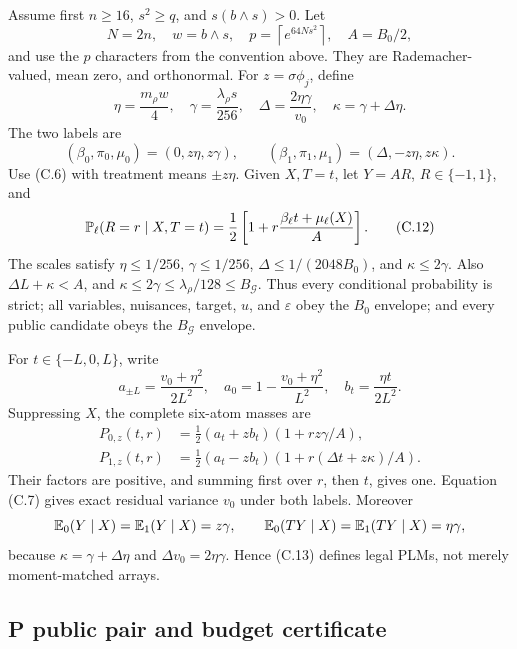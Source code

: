 Assume first \(n\ge16\), \(s^2\ge q\), and \(s(b\wedge s)>0\).  Let
\[
 N=2n,\quad w=b\wedge s,\quad
 p=\left\lceil e^{64Ns^2}\right\rceil,\quad
 A=B_0/2,
\]
and use the \(p\) characters from the convention above.  They are
Rademacher-valued, mean zero, and orthonormal.  For \(z=\sigma\phi_j\), define
\[
 \eta=\frac{m_\rho w}{4},\quad
 \gamma=\frac{\lambda_\rho s}{256},\quad
 \Delta=\frac{2\eta\gamma}{v_0},\quad
 \kappa=\gamma+\Delta\eta.
 \tag{C.10}
\]
The two labels are
\[
 (\beta_0,\pi_0,\mu_0)=(0,z\eta,z\gamma),\qquad
 (\beta_1,\pi_1,\mu_1)=(\Delta,-z\eta,z\kappa).
 \tag{C.11}
\]
Use (C.6) with treatment means \(\pm z\eta\).  Given \(X,T=t\), let
\(Y=AR\), \(R\in\{-1,1\}\), and
\[
 \mathbb P_\ell(R=r\mid X,T=t)
 =\frac12\left[1+r\frac{\beta_\ell t+\mu_\ell(X)}A\right].
 \tag{C.12}
\]
The scales satisfy \(\eta\le1/256\), \(\gamma\le1/256\),
\(\Delta\le1/(2048B_0)\), and \(\kappa\le2\gamma\).
Also \(\Delta L+\kappa<A\), and
\(\kappa\le2\gamma\le\lambda_\rho/128\le B_{\mathcal G}\).
Thus every conditional probability is strict; all variables, nuisances,
target, \(u\), and \(\varepsilon\) obey the \(B_0\) envelope; and every
public candidate obeys the \(B_{\mathcal G}\) envelope.

For \(t\in\{-L,0,L\}\), write
\[
 a_{\pm L}=\frac{v_0+\eta^2}{2L^2},\quad
 a_0=1-\frac{v_0+\eta^2}{L^2},\quad
 b_t=\frac{\eta t}{2L^2}.
\]
Suppressing \(X\), the complete six-atom masses are
\begin{align}
 P_{0,z}(t,r)&=\tfrac12(a_t+zb_t)(1+rz\gamma/A),\nonumber\\
 P_{1,z}(t,r)&=\tfrac12(a_t-zb_t)(1+r(\Delta t+z\kappa)/A).
 \tag{C.13}
\end{align}
Their factors are positive, and summing first over \(r\), then \(t\), gives
one.  Equation (C.7) gives exact residual variance \(v_0\) under both labels.
Moreover
\[
 \mathbb E_0(Y\mid X)=\mathbb E_1(Y\mid X)=z\gamma,\qquad
 \mathbb E_0(TY\mid X)=\mathbb E_1(TY\mid X)=\eta\gamma,
\]
because \(\kappa=\gamma+\Delta\eta\) and
\(\Delta v_0=2\eta\gamma\).  Hence (C.13) defines legal PLMs, not merely
moment-matched arrays.

\subsection{P public pair and budget certificate}
\label{app:p-budget}

